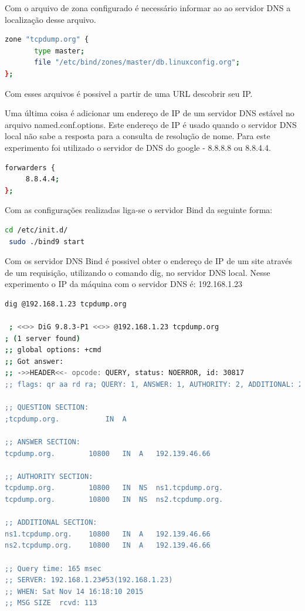 \documentclass[12pt,openright,a4paper]{report}
\begin{document}
Com o arquivo de zona configurado é necessário informar ao ao servidor DNS a localização desse arquivo.

\begin{lstlisting}[language=bash]
zone "tcpdump.org" {
       type master;
       file "/etc/bind/zones/master/db.linuxconfig.org";
};
\end{lstlisting}

Com esses arquivos é possivel a partir de uma URL descobrir seu IP.

Uma última coisa é adicionar um endereço de IP de um servidor DNS estável no arquivo named.conf.options. Este endereço de IP é usado quando o servidor DNS local não sabe a resposta para a consulta de resolução de nome. Para este experimento foi utilizado o servidor de DNS do google - 8.8.8.8 ou 8.8.4.4.

\begin{lstlisting}[language=bash]
 forwarders {
     8.8.4.4;
};
\end{lstlisting}

Com as configurações realizadas liga-se o servidor Bind da seguinte forma:

\begin{lstlisting}[language=bash]
 cd /etc/init.d/
 sudo ./bind9 start
\end{lstlisting}

Com os servidor DNS Bind é possivel obter o endereço de IP de um site através de um requisição, utilizando o comando dig, no servidor DNS local. Nesse experimento o IP da máquina com o servidor DNS é: 192.168.1.23

\begin{lstlisting}[language=bash]
 dig @192.168.1.23 tcpdump.org

 ; <<>> DiG 9.8.3-P1 <<>> @192.168.1.23 tcpdump.org
; (1 server found)
;; global options: +cmd
;; Got answer:
;; ->>HEADER<<- opcode: QUERY, status: NOERROR, id: 30817
;; flags: qr aa rd ra; QUERY: 1, ANSWER: 1, AUTHORITY: 2, ADDITIONAL: 2

;; QUESTION SECTION:
;tcpdump.org.			IN	A

;; ANSWER SECTION:
tcpdump.org.		10800	IN	A	192.139.46.66

;; AUTHORITY SECTION:
tcpdump.org.		10800	IN	NS	ns1.tcpdump.org.
tcpdump.org.		10800	IN	NS	ns2.tcpdump.org.

;; ADDITIONAL SECTION:
ns1.tcpdump.org.	10800	IN	A	192.139.46.66
ns2.tcpdump.org.	10800	IN	A	192.139.46.66

;; Query time: 165 msec
;; SERVER: 192.168.1.23#53(192.168.1.23)
;; WHEN: Sat Nov 14 16:18:10 2015
;; MSG SIZE  rcvd: 113
\end{lstlisting}
\end{document}
